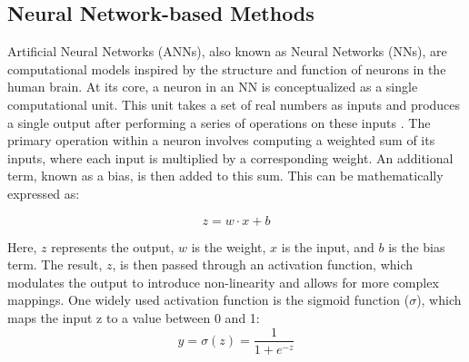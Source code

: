         \subsection{Neural Network-based Methods}
        
        Artificial Neural Networks (ANNs), also known as Neural Networks (NNs), are computational models inspired by the structure and function of neurons in the human brain. At its core, a neuron in an NN is conceptualized as a single computational unit. This unit takes a set of real numbers as inputs and produces a single output after performing a series of operations on these inputs \cite{jm3_llm_book}.
        The primary operation within a neuron involves computing a weighted sum of its inputs, where each input is multiplied by a corresponding weight. An additional term, known as a bias, is then added to this sum. This can be mathematically expressed as:

        \begin{equation}
            z = w \cdot x + b
            \label{eq:linear}
        \end{equation}

        Here, $z$ represents the output, $w$ is the weight, $x$ is the input, and $b$ is the bias term. 
        The result, $z$, is then passed through an activation function, which modulates the output to introduce non-linearity and allows for more complex mappings. One widely used activation function is the sigmoid function ($\sigma$), which maps the input z to a value between 0 and 1:
        \begin{equation}
            y = \sigma(z) =\frac{1}{1+ e^{-z}}
            \label{eq:sigma}
        \end{equation}

